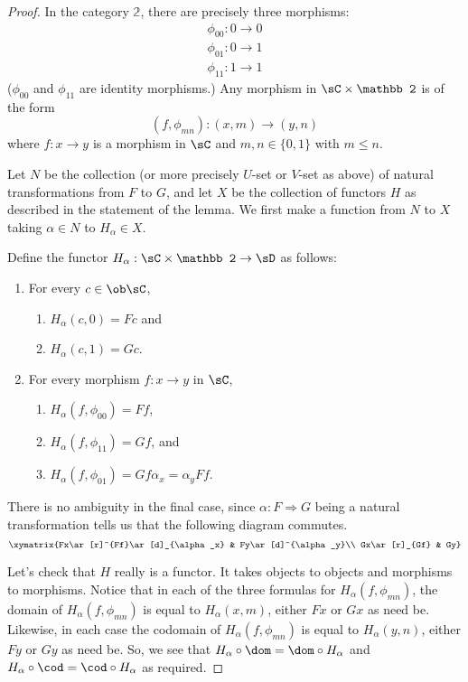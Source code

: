 \documentclass[main.tex]{subfiles}
\begin{document}
\begin{proof}
	In the category ${\mathbb 2}$, there are precisely three morphisms:
	\[\begin{array}{l}\phi_{00}:0\rightarrow 0\\ \phi_{01}:0\rightarrow 1\\
	\phi_{11}:1\rightarrow 1\end{array}\] ($\phi_{00}$ and $\phi_{11}$ are
	identity morphisms.) Any morphism in $\sC\times\mathbb 2$ is of the form
	\[(f,\phi_{mn}):(x,m)\rightarrow(y,n)\] where $f:x\rightarrow y$ is a
	morphism in $\sC$ and $m,n\in\{0,1\}$ with $m\le n$.

	Let $N$ be the collection (or more precisely $U$-set or $V$-set as above) of
	natural transformations from $F$ to $G$, and let $X$ be the collection of
	functors $H$ as described in the statement of the lemma. We first make a
	function from $N$ to $X$ taking $\alpha\in N$ to $H_\alpha\in X$.

	Define the functor $H_\alpha:\sC\times{\mathbb 2}\rightarrow\sD$ as follows:
	\begin{enumerate}
		\item For every $c\in\ob\sC$,
			\begin{enumerate}
				\item $H_\alpha(c,0)=Fc$ and
				\item $H_\alpha(c,1)=Gc$.
			\end{enumerate}
		\item For every morphism $f:x\rightarrow y$ in $\sC$,
			\begin{enumerate}
				\item $H_\alpha(f,\phi_{00})=Ff$,
				\item $H_\alpha(f,\phi_{11})=Gf$, and
				\item $H_\alpha(f,\phi_{01})=Gf\alpha_x=\alpha_yFf$.
			\end{enumerate}
	\end{enumerate}
	There is no ambiguity in the final case, since $\alpha:F\Rightarrow G$ being
	a natural transformation tells us that the following diagram commutes.
	\[\xymatrix{Fx\ar[r]^{Ff}\ar[d]_{\alpha_x} & Fy\ar[d]^{\alpha_y}\\
	Gx\ar[r]_{Gf} & Gy}\]

	Let's check that $H$ really is a functor. It takes objects to objects and
	morphisms to morphisms. Notice that in each of the three  formulas for
	$H_\alpha(f,\phi_{mn})$, the domain of $H_\alpha(f,\phi_{mn})$ is equal to
	$H_\alpha(x,m)$, either $Fx$ or $Gx$ as need be. Likewise, in each case the
	codomain of $H_\alpha(f,\phi_{mn})$ is equal to $H_\alpha(y,n)$, either $Fy$
	or $Gy$ as need be. So, we see that $H_\alpha\circ\dom=\dom\circ H_\alpha$
	and $H_\alpha\circ\cod=\cod\circ H_\alpha$ as required.


\end{proof}
\end{document}
